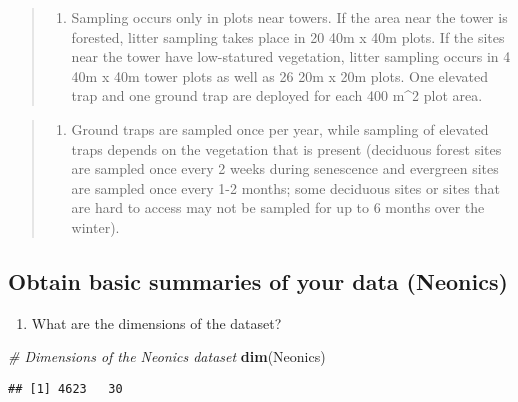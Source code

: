 \documentclass[]{article}
\newenvironment{Shaded}{\begin{snugshade}}{\end{snugshade}}
\newcommand{\CommentTok}[1]{\textcolor[rgb]{0.56,0.35,0.01}{\textit{#1}}}
\newcommand{\KeywordTok}[1]{\textcolor[rgb]{0.13,0.29,0.53}{\textbf{#1}}}
\newcommand{\NormalTok}[1]{#1}
\providecommand{\tightlist}{%
  \setlength{\itemsep}{0pt}\setlength{\parskip}{0pt}}
\begin{document}
\begin{quote}
\begin{enumerate}
\def\labelenumi{\arabic{enumi}.}
\setcounter{enumi}{1}
\tightlist
\item
  Sampling occurs only in plots near towers. If the area near the tower
  is forested, litter sampling takes place in 20 40m x 40m plots. If the
  sites near the tower have low-statured vegetation, litter sampling
  occurs in 4 40m x 40m tower plots as well as 26 20m x 20m plots. One
  elevated trap and one ground trap are deployed for each 400 m\^{}2
  plot area.
\end{enumerate}
\end{quote}

\begin{quote}
\begin{enumerate}
\def\labelenumi{\arabic{enumi}.}
\setcounter{enumi}{2}
\tightlist
\item
  Ground traps are sampled once per year, while sampling of elevated
  traps depends on the vegetation that is present (deciduous forest
  sites are sampled once every 2 weeks during senescence and evergreen
  sites are sampled once every 1-2 months; some deciduous sites or sites
  that are hard to access may not be sampled for up to 6 months over the
  winter).
\end{enumerate}
\end{quote}

\hypertarget{obtain-basic-summaries-of-your-data-neonics}{%
\subsection{Obtain basic summaries of your data
(Neonics)}\label{obtain-basic-summaries-of-your-data-neonics}}

\begin{enumerate}
\def\labelenumi{\arabic{enumi}.}
\setcounter{enumi}{4}
\tightlist
\item
  What are the dimensions of the dataset?
\end{enumerate}

\begin{Shaded}
\begin{Highlighting}[]
\CommentTok{# Dimensions of the Neonics dataset}
\KeywordTok{dim}\NormalTok{(Neonics)}
\end{Highlighting}
\end{Shaded}

\begin{verbatim}
## [1] 4623   30
\end{verbatim}
\end{document}
